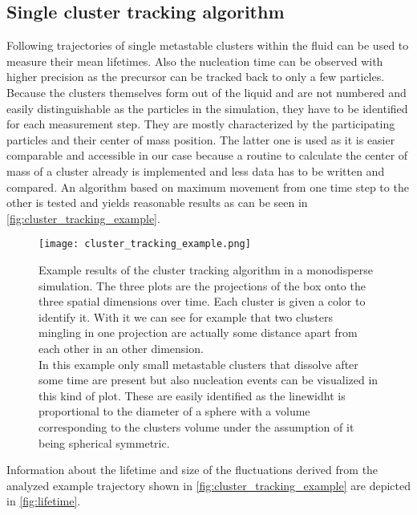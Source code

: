 \subsection{Single cluster tracking algorithm}
\label{sec:tracking}
Following trajectories of single metastable clusters within the fluid can be used to measure their mean lifetimes. Also the nucleation time can be observed with higher precision as the precursor can be tracked back to only a few particles.\\ 
Because the clusters themselves form out of the liquid and are not numbered and easily distinguishable as the particles in the simulation, they have to be identified for each measurement step. They are mostly characterized by the participating particles and their center of mass position. The latter one is used as it is easier comparable and accessible in our case because a routine to calculate the center of mass of a cluster already is implemented and less data has to be written and compared. An algorithm based on maximum movement from one time step to the other is tested and yields reasonable results as can be seen in \autoref{fig:cluster_tracking_example}.\\

\begin{figure}[h]
\centering
\texttt{[image: cluster\_tracking\_example.png]}
\caption[Individual cluster tracking example]{Example results of the cluster tracking algorithm in a monodisperse simulation. The three plots are the projections of the box onto the three spatial dimensions over time. Each cluster is given a color to identify it. With it we can see for example that two clusters mingling in one projection are actually some distance apart from each other in an other dimension.\\
In this example only small metastable clusters that dissolve after some time are present but also nucleation events can be visualized in this kind of plot. These are easily identified as the linewidht is proportional to the diameter of a sphere with a volume corresponding to the clusters volume under the assumption of it being spherical symmetric.}
\label{fig:cluster_tracking_example}
\end{figure}

Information about the lifetime and size of the fluctuations derived from the analyzed example trajectory shown in \autoref{fig:cluster_tracking_example} are depicted in \autoref{fig:lifetime}.\\

